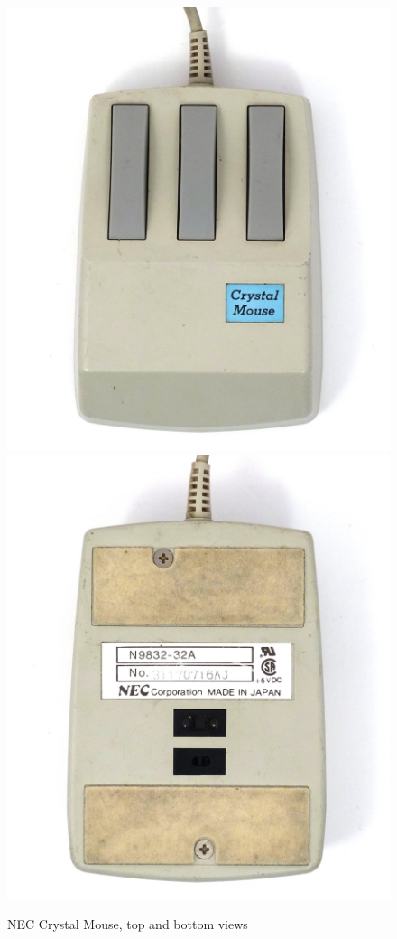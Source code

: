 \documentclass[11pt, a4paper]{article}
\begin{document}
\begin{figure}[h]
    \centering
    \includegraphics[scale=0.5]{1986_nec_crystal_mouse/nectop_60.jpg}
    \includegraphics[scale=0.5]{1986_nec_crystal_mouse/necbottom_60.jpg}
    \caption{NEC Crystal Mouse, top and bottom views}
    \label{NecCrystalTopAndBottom}
\end{figure}
\end{document}
